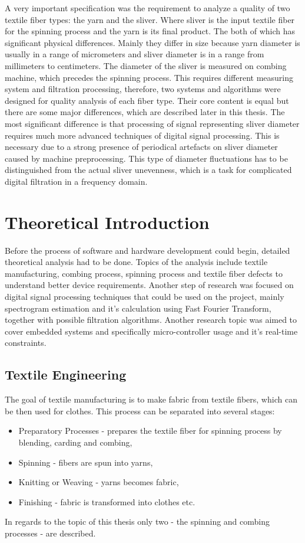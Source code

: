 \documentclass[twoside]{ctuthesis}
\theoremstyle{plain}
\theoremstyle{definition}
\theoremstyle{note}
\begin{document}
A very important specification was the requirement to analyze a quality of two textile fiber types: the  yarn and the sliver. Where sliver is the input textile fiber for the spinning process and the yarn is its final product. The both of which has significant physical differences. Mainly they differ in size because yarn diameter is usually in a range of micrometers and sliver diameter is in a range from millimeters to centimeters. The diameter of the sliver is measured on combing machine, which precedes the spinning process. This requires different measuring system and filtration processing, therefore, two systems and algorithms were designed for quality analysis of each fiber type. Their core content is equal but there are some major differences, which are described later in this thesis. The most significant difference is that processing of signal representing sliver diameter requires much more advanced techniques of digital signal processing. This is necessary due to a strong presence of periodical artefacts on sliver diameter caused by machine preprocessing. This type of diameter fluctuations has to be distinguished from the actual sliver unevenness, which is a task for complicated digital filtration in a frequency domain.

\chapter{Theoretical Introduction}
Before the process of software and hardware development could begin, detailed theoretical analysis had to be done. Topics of the analysis include textile manufacturing, combing process, spinning process and textile fiber defects to understand better device requirements. Another step of research was focused on digital signal processing techniques that could be used on the project, mainly spectrogram estimation and it's calculation using Fast Fourier Transform, together with possible filtration algorithms. Another research topic was aimed to cover embedded systems and specifically micro-controller usage and it's real-time constraints.
\section{Textile Engineering}
The goal of textile manufacturing is to make fabric from textile fibers, which can be then used for clothes. This process can be separated into several stages:
\begin{itemize}
	\setlength{\itemsep}{5pt}
\item Preparatory Processes - prepares the textile fiber for spinning process by blending, carding and combing,

\item Spinning - fibers are spun into yarns,

\item Knitting or Weaving - yarns becomes fabric,

\item Finishing - fabric is transformed into clothes etc.
\end{itemize}
In regards to the topic of this thesis only two - the spinning and combing processes - are described.
\end{document}
